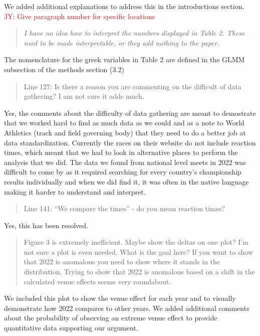 \documentclass[12pt]{article}
\newcommand{\jy}[1]{\textcolor{red}{JY: #1}}
\newenvironment{comment}%
{\begin{quotation}\noindent\small\it\color{darkblue}\ignorespaces%
}{\end{quotation}}
\begin{document}
We added additional explanations to address this in the introductions section.
\jy{Give paragraph number for specific locations}

\begin{comment}I have no idea how to interpret the numbers displayed in Table 2. These
need to be made interpretable, or they add nothing to the paper.
\end{comment}

The nomenclature for the greek variables in Table 2 are defined in the GLMM
subsection of the methods section (3.2)

\begin{comment}
Line 127: Is there a reason you are commenting on the difficult of data
gathering? I am not sure it adds much.
\end{comment}

Yes, the comments about the difficulty of data gathering are meant to demostrate
that we worked hard to find as much data as we could and as a note to World
Athletics (track and field governing body) that they need to do a better job
at data standardization.  Currently the races on their website do not include
reaction times, which meant that we had to look in alternative places to perform
the analysis that we did.  The data we found from national level meets in 2022
was difficult to come by as it required searching for every country's championship
results individually and when we did find it, it was often in the native language
making it harder to understand and interpret.

\begin{comment}
Line 141: “We compare the times” - do you mean reaction times?
\end{comment}

Yes, this has been resolved.

\begin{comment}
Figure 3 is extremely inefficient. Maybe show the deltas on one plot? I'm not
sure a plot is even needed. What is the goal here? If you want to show that 2022
is anomalous you need to show where it stands in the distribution. Trying to
show that 2022 is anomalous based on a shift in the calculated venue effects
seems very roundabout.
\end{comment}

We included this plot to show the venue effect for each year and to visually
demonstrate how 2022 compares to other years.  We added additional comments
about the probability of observing an extreme venue effect to provide
quantitative data supporting our argument.
\end{document}
